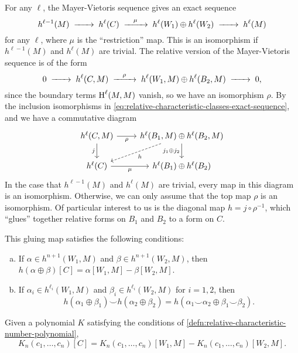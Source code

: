 For any $\ell$, the Mayer-Vietoris sequence gives an exact sequence
\[
	h^{\ell-1}(M)\lkxto h^{\ell}(C) \lkxto[\mu] h^{\ell}(W_1)\oplus h^{\ell}(W_2) \lkxto h^{\ell}(M)
\]
for any $\ell$, where $\mu$ is the ``restriction'' map. This is an isomorphism if $h^{\ell-1}(M)$ and $h^\ell(M)$ are trivial.
The relative version of the Mayer-Vietoris sequence is of the form
\[
	0 \lkxto h^{\ell}(C, M) \lkxto[\rho] h^{\ell}(W_1,M)\oplus h^{\ell}(B_2,M) \lkxto 0,
\]
since the boundary terms $\operatorname{H}^\ell(M,M)$ vanish, so we have an isomorphism $\rho$.
By the inclusion isomorphisms in \cref{eq:relative-characteristic-classes-exact-sequence}, and we have a commutative diagram
\begin{equation}\label{eq:closing_coboundaries_square}
	\begin{tikzcd}
		{h^{\ell}(C,M)} & {h^{\ell}(B_1,M)\oplus h^{\ell}(B_2,M)} \\
		{h^{\ell}(C)} & {h^{\ell}(B_1)\oplus h^{\ell}(B_2)}
		\arrow["j_1\oplus j_2"', from=1-2, to=2-2]
		\arrow["\rho"', from=1-1, to=1-2]
		\arrow["j"', from=1-1, to=2-1]
		\arrow["\mu"', from=2-1, to=2-2]
		\arrow["h", from=1-2, to=2-1, dashed]
	\end{tikzcd}
\end{equation}
In the case that $h^{\ell-1}(M)$ and $h^\ell(M)$ are trivial, every map in this diagram is an isomorphism. Otherwise, we can only assume that the top map $\rho$ is an isomorphism.
Of particular interest to us is the diagonal map $h = j\circ \rho^{-1}$, which ``glues'' together relative forms on $B_1$ and $B_2$ to a form on $C$. 

\begin{proposition}\label{prop:invariant-variation-naturality}
	This gluing map satisfies the following conditions:
	\begin{enumerate}[(a)]
		\item If $\alpha\in h^{n+1}(W_1, M)$ and $\beta\in h^{n+1}(W_2,M)$, then
		      $h(\alpha\oplus \beta)[C] = \alpha[W_1, M] - \beta[W_2, M]$.
		\item If $\alpha_i\in h^{\ell_i}(W_1,M)$ and $\beta_i \in h^{\ell_i}(W_2,M)$ for $i=1,2$, then
		      \[h(\alpha_1\oplus\beta_1) \smile h(\alpha_2\oplus \beta_2) = h(\alpha_1\smile \alpha_2 \oplus \beta_1\smile \beta_2).\]
	\end{enumerate}
\end{proposition}

\begin{corollary}\label{prop:relative-characteristic-number-variation}
	Given a polynomial $K$ satisfying the conditions of \cref{defn:relative-characteristic-number-polynomial},
	\[
		K_n(c_1,\ldots, c_n)[C] = K_n(c_1,\ldots, c_n)[W_1, M] - K_n(c_1,\ldots, c_n)[W_2, M].
	\]
\end{corollary}

